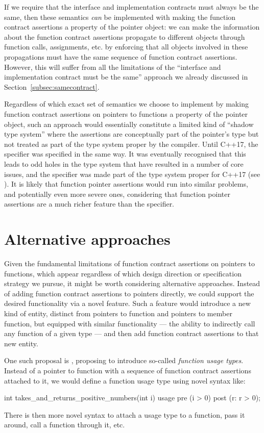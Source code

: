 If we require that the interface and implementation contracts must always be the same, then these semantics \emph{can} be implemented with making the function contract assertions a property of the pointer object: we can make the information about the function contract assertions propagate to different objects through function calls, assignments, etc. by enforcing that all objects involved in these propagations must have the same sequence of function contract assertions. However, this will suffer from all the limitations of the ``interface and implementation contract must be the same'' approach we already discussed in Section~\ref{subsec:samecontract}.

Regardless of which exact set of semantics we choose to implement by making function contract assertions on pointers to functions a property of the pointer object, such an approach would essentially constitute a limited kind of ``shadow type system'' where the assertions are conceptually part of the pointer's type but not treated as part of the type system proper by the compiler. Until C++17, the  specifier was specified in the same way. It was eventually recognised that this leads to odd holes in the type system that have resulted in a number of core issues, and the  specifier was made part of the type system proper for C++17 (see \cite{P0012R1}). It is likely that function pointer assertions would run into similar problems, and potentially even more severe ones, considering that function pointer assertions are a much richer feature than the  specifier.

\section{Alternative approaches}

Given the fundamental limitations of function contract assertions on pointers to functions, which appear regardless of which design direction or specification strategy we pursue, it might be worth considering alternative approaches. Instead of adding function contract assertions to pointers directly, we could support the desired functionality via a novel feature. Such a feature would  introduce a new kind of entity, distinct from pointers to function and pointers to member function, but equipped with similar functionality --- the ability to indirectly call any function of a given type --- and then add function contract assertions to that new entity.

One such proposal is \cite{P3271R0}, proposing to introduce so-called \emph{function usage types}. Instead of a pointer to function with a sequence of function contract assertions attached to it, we would define a function usage type using novel syntax like:
\begin{codeblock}
int takes_and_returns_positive_numbers(int i) usage 
  pre (i > 0)
  post (r: r > 0);
\end{codeblock}
There is then more novel syntax to attach a usage type to a function, pass it around, call a function through it, etc.

